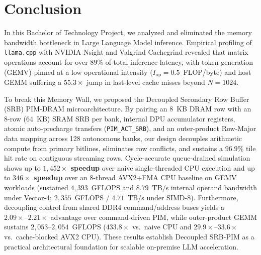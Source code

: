 \documentclass[conference]{IEEEtran}
\begin{document}
\section{Conclusion}
\label{sec:conclusion}
In this Bachelor of Technology Project, we analyzed and eliminated the memory bandwidth bottleneck in Large Language Model inference. Empirical profiling of \texttt{llama.cpp} with NVIDIA Nsight and Valgrind Cachegrind revealed that matrix operations account for over $89\%$ of total inference latency, with token generation (GEMV) pinned at a low operational intensity ($I_{\text{op}} = 0.5$~FLOP/byte) and host GEMM suffering a $55.3\times$ jump in last-level cache misses beyond $N = 1024$.

To break this Memory Wall, we proposed the Decoupled Secondary Row Buffer (SRB) PIM-DRAM microarchitecture. By pairing an 8~KB DRAM row with an 8-row ($64$~KB) SRAM SRB per bank, internal DPU accumulator registers, atomic auto-precharge transfers (\texttt{PIM\_ACT\_SRB}), and an outer-product Row-Major data mapping across 128 autonomous banks, our design decouples arithmetic compute from primary bitlines, eliminates row conflicts, and sustains a $96.9\%$ tile hit rate on contiguous streaming rows. Cycle-accurate queue-drained simulation shows up to \textbf{$1,452\times$ speedup} over naive single-threaded CPU execution and up to \textbf{$346\times$ speedup} over an 8-thread AVX2+FMA CPU baseline on GEMV workloads (sustained $4,393$~GFLOPS and $8.79$~TB/s internal operand bandwidth under Vector-4; $2,355$~GFLOPS / $4.71$~TB/s under SIMD-8). Furthermore, decoupling control from shared DDR4 command/address buses yields a $2.09\times\text{--}2.21\times$ advantage over command-driven PIM, while outer-product GEMM sustains $2,053\text{--}2,054$~GFLOPS ($433.8\times$ vs.\ naive CPU and $29.9\times\text{--}33.6\times$ vs.\ cache-blocked AVX2 CPU). These results establish Decoupled SRB-PIM as a practical architectural foundation for scalable on-premise LLM acceleration.
\end{document}
